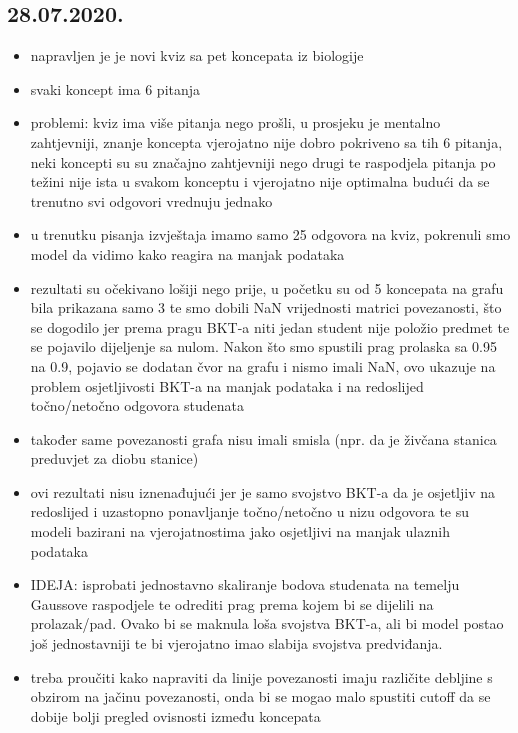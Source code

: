 \documentclass[times, utf8,projekt]{fer}
\begin{document}
		\subsection{28.07.2020.}
		\begin{itemize}
			\item napravljen je je novi kviz sa pet koncepata iz biologije
			\item svaki koncept ima 6 pitanja
			\item problemi: kviz ima više pitanja nego prošli, u prosjeku je mentalno zahtjevniji, znanje koncepta vjerojatno nije dobro pokriveno sa tih 6 pitanja, neki koncepti su su značajno zahtjevniji nego drugi te raspodjela pitanja po težini nije ista u svakom konceptu i vjerojatno nije optimalna budući da se trenutno svi odgovori vrednuju jednako
			\item u trenutku pisanja izvještaja imamo samo 25 odgovora na kviz, pokrenuli smo model da vidimo kako reagira na manjak podataka
			\item rezultati su očekivano lošiji nego prije, u početku su od 5 koncepata na grafu bila prikazana samo 3 te smo dobili NaN vrijednosti matrici povezanosti, što se dogodilo jer prema pragu BKT-a niti jedan student nije položio predmet te se pojavilo dijeljenje sa nulom. Nakon što smo spustili prag prolaska sa 0.95 na 0.9, pojavio se dodatan čvor na grafu i nismo imali NaN, ovo ukazuje na problem osjetljivosti BKT-a na manjak podataka i na redoslijed točno/netočno odgovora studenata
			\item također same povezanosti grafa nisu imali smisla (npr. da je živčana stanica preduvjet za diobu stanice)
			\item ovi rezultati nisu iznenađujući jer je samo svojstvo BKT-a da je osjetljiv na redoslijed i uzastopno ponavljanje točno/netočno u nizu odgovora te su modeli bazirani na vjerojatnostima jako osjetljivi na manjak ulaznih podataka
			\item IDEJA: isprobati jednostavno skaliranje bodova studenata na temelju Gaussove raspodjele te odrediti prag prema kojem bi se dijelili na prolazak/pad. Ovako bi se maknula loša svojstva BKT-a, ali bi model postao još jednostavniji te bi vjerojatno imao slabija svojstva predviđanja.
			\item treba proučiti kako napraviti da linije povezanosti imaju različite debljine s obzirom na jačinu povezanosti, onda bi se mogao malo spustiti cutoff da se dobije bolji pregled ovisnosti između koncepata
		\end{itemize}
\end{document}
